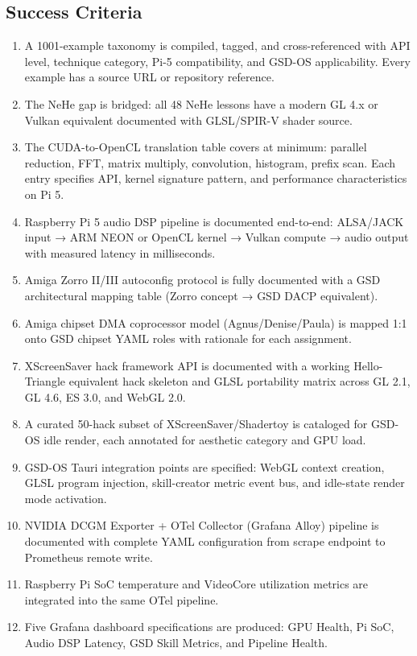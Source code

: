 \documentclass[11pt,letterpaper]{article}
\begin{document}
\subsection{Success Criteria}

\begin{enumerate}
  \item A 1001-example taxonomy is compiled, tagged, and cross-referenced with API level, technique category, Pi-5 compatibility, and GSD-OS applicability. Every example has a source URL or repository reference.
  \item The NeHe gap is bridged: all 48 NeHe lessons have a modern GL 4.x or Vulkan equivalent documented with GLSL/SPIR-V shader source.
  \item The CUDA-to-OpenCL translation table covers at minimum: parallel reduction, FFT, matrix multiply, convolution, histogram, prefix scan. Each entry specifies API, kernel signature pattern, and performance characteristics on Pi 5.
  \item Raspberry Pi 5 audio DSP pipeline is documented end-to-end: ALSA/JACK input → ARM NEON or OpenCL kernel → Vulkan compute → audio output with measured latency in milliseconds.
  \item Amiga Zorro II/III autoconfig protocol is fully documented with a GSD architectural mapping table (Zorro concept → GSD DACP equivalent).
  \item Amiga chipset DMA coprocessor model (Agnus/Denise/Paula) is mapped 1:1 onto GSD chipset YAML roles with rationale for each assignment.
  \item XScreenSaver hack framework API is documented with a working Hello-Triangle equivalent hack skeleton and GLSL portability matrix across GL 2.1, GL 4.6, ES 3.0, and WebGL 2.0.
  \item A curated 50-hack subset of XScreenSaver/Shadertoy is cataloged for GSD-OS idle render, each annotated for aesthetic category and GPU load.
  \item GSD-OS Tauri integration points are specified: WebGL context creation, GLSL program injection, skill-creator metric event bus, and idle-state render mode activation.
  \item NVIDIA DCGM Exporter + OTel Collector (Grafana Alloy) pipeline is documented with complete YAML configuration from scrape endpoint to Prometheus remote write.
  \item Raspberry Pi SoC temperature and VideoCore utilization metrics are integrated into the same OTel pipeline.
  \item Five Grafana dashboard specifications are produced: GPU Health, Pi SoC, Audio DSP Latency, GSD Skill Metrics, and Pipeline Health.
\end{enumerate}
\end{document}
